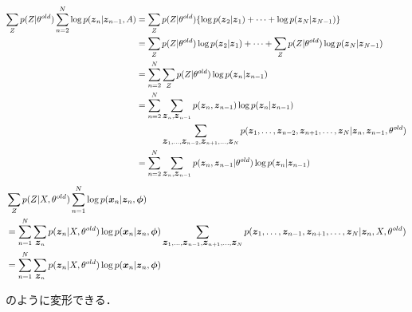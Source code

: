 \begin{align}
  \sum_Zp(Z| \theta^{old})\sum_{n=2}^N\log p(\bvec{z}_n|\bvec{z}_{n-1},A) &= \sum_Zp(Z| \theta^{old})\{\log p(\bvec{z}_2|\bvec{z}_1) + \dots + \log p(\bvec{z}_N|\bvec{z}_{N-1})\} \\
  &= \sum_Zp(Z| \theta^{old})\log p(\bvec{z}_2|\bvec{z}_1) + \dots + \sum_Zp(Z| \theta^{old})\log p(\bvec{z}_N|\bvec{z}_{N-1}) \\
  &= \sum_{n=2}^N\sum_Zp(Z|\theta^{old})\log p(\bvec{z}_n|\bvec{z}_{n-1}) \\
  &= \sum_{n=2}^N\sum_{\bvec{z}_n,\bvec{z}_{n-1}}p(\bvec{z}_n,\bvec{z}_{n-1})\log p(\bvec{z}_n|\bvec{z}_{n-1}) \\
  &\hspace{10mm}\sum_{\bvec{z}_1,\dots,\bvec{z}_{n-2},\bvec{z}_{n+1},\dots,\bvec{z}_N}p(\bvec{z}_1,\dots,\bvec{z}_{n-2},\bvec{z}_{n+1},\dots,\bvec{z}_N|\bvec{z}_n,\bvec{z}_{n-1},\theta^{old}) \\
  &= \sum_{n=2}^N\sum_{\bvec{z}_n,\bvec{z}_{n-1}}p(\bvec{z}_n,\bvec{z}_{n-1}|\theta^{old})\log p(\bvec{z}_n|\bvec{z}_{n-1}) \label{eq:transition}\\
\end{align}
\begin{align}
  & \sum_Zp(Z|X,\theta^{old})\sum_{n=1}^N\log p(\mbox{\boldmath $x$}_n|\mbox{\boldmath $z$}_n,\mbox{\boldmath $\phi$}) \\
  &= \sum_{n=1}^N\sum_{\mbox{\boldmath $z$}_n}p(\mbox{\boldmath $z$}_n|X,\theta^{old})\log p(\mbox{\boldmath $x$}_n|\mbox{\boldmath $z$}_n,\mbox{\boldmath $\phi$})\sum_{\mbox{\boldmath $z$}_1,\dots,\mbox{\boldmath $z$}_{n-1},\mbox{\boldmath $z$}_{n+1},\dots,\mbox{\boldmath $z$}_N}p(\mbox{\boldmath $z$}_1,\dots,\mbox{\boldmath $z$}_{n-1},\mbox{\boldmath $z$}_{n+1},\dots,\mbox{\boldmath $z$}_N|\mbox{\boldmath $z$}_n,X,\theta^{old}) \\
  &= \sum_{n=1}^N\sum_{\mbox{\boldmath $z$}_n}p(\mbox{\boldmath $z$}_n|X,\theta^{old})\log p(\mbox{\boldmath $x$}_n|\mbox{\boldmath $z$}_n,\mbox{\boldmath $\phi$}) \label{eq:emission}
\end{align}

のように変形できる．

